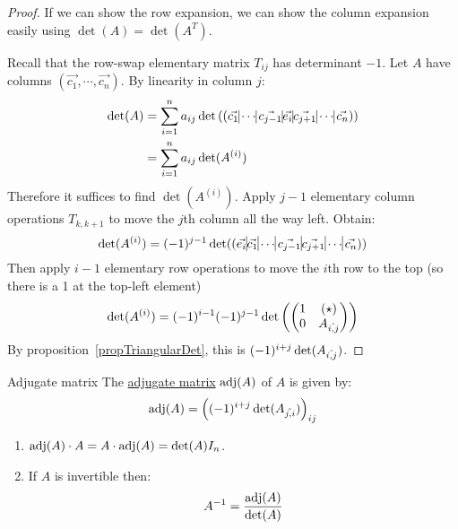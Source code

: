 \documentclass[../Main.tex]{subfiles}
\begin{document}
\begin{proof}
    If we can show the row expansion, we can show the column expansion easily using $\det(A) = \det(A^T)$.

    Recall that the row-swap elementary matrix $T_{ij}$ has determinant $-1$. Let $A$ have columns $(\vec{c_1}, \cdots, \vec{c_n})$. By linearity in column $j$:
    \begin{align*}
        \det(A) &= \sum_{i=1}^{n} a_{ij} \det\left((\vec{c_1} \vline \cdots \vline \vec{c_{j-1}} \vline \vec{e_i} \vline \vec{c_{j+1}} \vline \cdots \vline \vec{c_n})\right) \\
        &= \sum_{i=1}^{n} a_{ij} \det(A^{(i)})
    \end{align*}
    Therefore it suffices to find $\det(A^{(i)})$. Apply $j-1$ elementary column operations $T_{k, k+1}$ to move the $j$th column all the way left. Obtain:
    \begin{equation*}
        \det(A^{(i)}) = (-1)^{j-1} \det((\vec{e_i} \vline \vec{c_1} \vline \cdots \vline \vec{c_{j-1}} \vline \vec{c_{j+1}} \vline \cdots \vline \vec{c_n}))
    \end{equation*}
    Then apply $i-1$ elementary row operations to move the $i$th row to the top (so there is a 1 at the top-left element)
    \begin{equation*}
        \det(A^{(i)}) = (-1)^{i-1} (-1)^{j-1} \det\left(\begin{pmatrix}
            1 & (\star) \\
            0 & {A}_{\hat{{i},{j}}}
        \end{pmatrix}
        \right)
    \end{equation*}
    By proposition~\ref{propTriangularDet}, this is $(-1)^{i+j} \det({A}_{\hat{{i},{j}}})$.
\end{proof}
\begin{definition}{Adjugate matrix}
    The \underline{adjugate matrix} $\operatorname{adj}(A)$ of $A$ is given by:
    \begin{equation*}
        \operatorname{adj}(A) = \left((-1)^{i+j} \det({A}_{\hat{{j},{i}}})\right)_{ij}
    \end{equation*}
\end{definition}
\begin{theorem}
    \begin{enumerate}
        \item $\operatorname{adj}(A) \cdot A = A \cdot \operatorname{adj}(A) = \det(A) I_n$.
        \item If $A$ is invertible then:
            \begin{equation*}
                A^{-1} = \frac{\operatorname{adj}(A)}{\det(A)}
            \end{equation*}
    \end{enumerate}
    \label{thmCramerRule}
\end{theorem}
\end{document}
